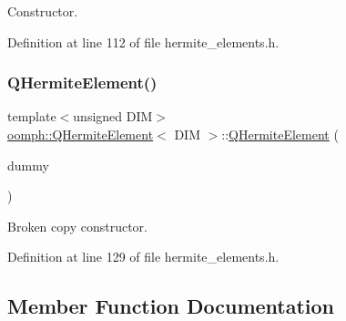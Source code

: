 Constructor. 



Definition at line 112 of file hermite\+\_\+elements.\+h.

\mbox{\label{classoomph_1_1QHermiteElement_a6dce1c70656dfcd8da365462b959e709}} 
\subsubsection{\texorpdfstring{Q\+Hermite\+Element()}{QHermiteElement()}\hspace{0.1cm}{\footnotesize\ttfamily [2/2]}}
{\footnotesize\ttfamily template$<$unsigned D\+IM$>$ \\
\hyperlink{classoomph_1_1QHermiteElement}{oomph\+::\+Q\+Hermite\+Element}$<$ D\+IM $>$\+::\hyperlink{classoomph_1_1QHermiteElement}{Q\+Hermite\+Element} (\begin{DoxyParamCaption}\item[{const \hyperlink{classoomph_1_1QHermiteElement}{Q\+Hermite\+Element}$<$ D\+IM $>$ \&}]{dummy }\end{DoxyParamCaption})\hspace{0.3cm}{\ttfamily [inline]}}



Broken copy constructor. 



Definition at line 129 of file hermite\+\_\+elements.\+h.



\subsection{Member Function Documentation}
\mbox{\label{classoomph_1_1QHermiteElement_a221b1fae4565b47b34786cb0579000b3}} 
